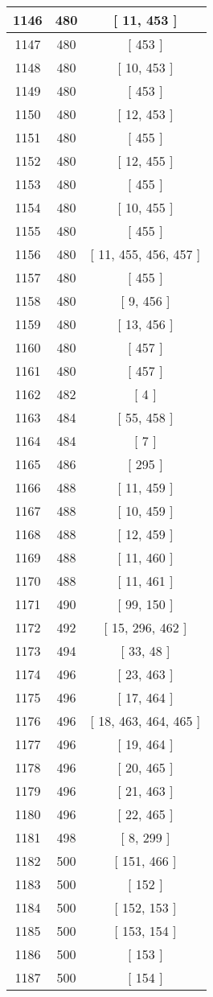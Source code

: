 \begin{center}
\begin{longtable}[H]{|| c c c ||}
\hline
1146 & 480 & [ 11, 453 ] \\ 
\hline
1147 & 480 & [ 453 ] \\ 
\hline
1148 & 480 & [ 10, 453 ] \\ 
\hline
1149 & 480 & [ 453 ] \\ 
\hline
1150 & 480 & [ 12, 453 ] \\ 
\hline
1151 & 480 & [ 455 ] \\ 
\hline
1152 & 480 & [ 12, 455 ] \\ 
\hline
1153 & 480 & [ 455 ] \\ 
\hline
1154 & 480 & [ 10, 455 ] \\ 
\hline
1155 & 480 & [ 455 ] \\ 
\hline
1156 & 480 & [ 11, 455, 456, 457 ] \\ 
\hline
1157 & 480 & [ 455 ] \\ 
\hline
1158 & 480 & [ 9, 456 ] \\ 
\hline
1159 & 480 & [ 13, 456 ] \\ 
\hline
1160 & 480 & [ 457 ] \\ 
\hline
1161 & 480 & [ 457 ] \\ 
\hline
1162 & 482 & [ 4 ] \\ 
\hline
1163 & 484 & [ 55, 458 ] \\ 
\hline
1164 & 484 & [ 7 ] \\ 
\hline
1165 & 486 & [ 295 ] \\ 
\hline
1166 & 488 & [ 11, 459 ] \\ 
\hline
1167 & 488 & [ 10, 459 ] \\ 
\hline
1168 & 488 & [ 12, 459 ] \\ 
\hline
1169 & 488 & [ 11, 460 ] \\ 
\hline
1170 & 488 & [ 11, 461 ] \\ 
\hline
1171 & 490 & [ 99, 150 ] \\ 
\hline
1172 & 492 & [ 15, 296, 462 ] \\ 
\hline
1173 & 494 & [ 33, 48 ] \\ 
\hline
1174 & 496 & [ 23, 463 ] \\ 
\hline
1175 & 496 & [ 17, 464 ] \\ 
\hline
1176 & 496 & [ 18, 463, 464, 465 ] \\ 
\hline
1177 & 496 & [ 19, 464 ] \\ 
\hline
1178 & 496 & [ 20, 465 ] \\ 
\hline
1179 & 496 & [ 21, 463 ] \\ 
\hline
1180 & 496 & [ 22, 465 ] \\ 
\hline
1181 & 498 & [ 8, 299 ] \\ 
\hline
1182 & 500 & [ 151, 466 ] \\ 
\hline
1183 & 500 & [ 152 ] \\ 
\hline
1184 & 500 & [ 152, 153 ] \\ 
\hline
1185 & 500 & [ 153, 154 ] \\ 
\hline
1186 & 500 & [ 153 ] \\ 
\hline
1187 & 500 & [ 154 ] \\ 
\hline
\end{longtable}
\end{center}
